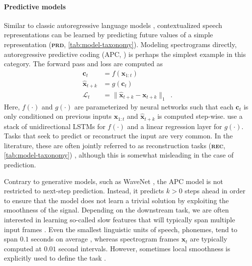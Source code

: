 {\paragraph{Predictive models}
Similar to classic autoregressive language models \parencite{mikolov_recurrent_2010}, contextualized speech representations can be learned by predicting future values of a simple representation \parencite{oord_representation_2018, chung_unsupervised_2019, schneider_wav2vec_2019, chung_generative_2020, jiang_further_2021} (\textbf{\textsc{prd}}, \cref{tab:model-taxonomy}). Modeling spectrograms directly, autoregressive predictive coding (APC, \citealp{chung_unsupervised_2019}) is perhaps the simplest example in this category. The forward pass and loss are computed as
\begin{align}
    \mathbf{c}_{t} &= f(\mathbf{x}_{1:t})  \label{eq_brief:apc_f} \\ 
    \hat{\mathbf{x}}_{t+k} &= g(\mathbf{c}_{t}) \\
    \mathcal{L}_t &= \lVert \hat{\mathbf{x}}_{t+k} - \mathbf{x}_{t+k} \rVert_1\enspace.
\end{align}
%
\noindent Here, $f(\cdot)$ and $g(\cdot)$ are parameterized by neural networks such that each $\mathbf{c}_t$ is only conditioned on previous inputs $\mathbf{x}_{1:t}$ and $\hat{\mathbf{x}}_{t+k}$ is computed step-wise. \textcite{chung_unsupervised_2019} use a stack of unidirectional LSTMs for $f(\cdot)$ and a linear regression layer for $g(\cdot)$. Tasks that seek to predict or reconstruct the input are very common. In the literature, these are often jointly referred to as reconstruction tasks (\textbf{\textsc{rec}}, \cref{tab:model-taxonomy}) \parencite{liu_tera_2021, wang_unispeech_2021}, although this is somewhat misleading in the case of prediction.

Contrary to generative models, such as WaveNet \parencite{oord_wavenet_2016}, the APC model is not restricted to next-step prediction. Instead, it predicts $k > 0$ steps ahead in order to ensure that the model does not learn a trivial solution by exploiting the smoothness of the signal. Depending on the downstream task, we are often interested in learning so-called slow features that will typically span multiple input frames \parencite{wiskott_slow_2002}. Even the smallest linguistic units of speech, phonemes, tend to span $0.1$ seconds on average \parencite{garofolo_timit_1993}, whereas spectrogram frames $\mathbf{x}_t$ are typically computed at $0.01$ second intervals. However, sometimes local smoothness is explicitly used to define the task \parencite{badino_autoencoder_2014, jati_speaker2vec_2017, jati_neural_2019}.

}
